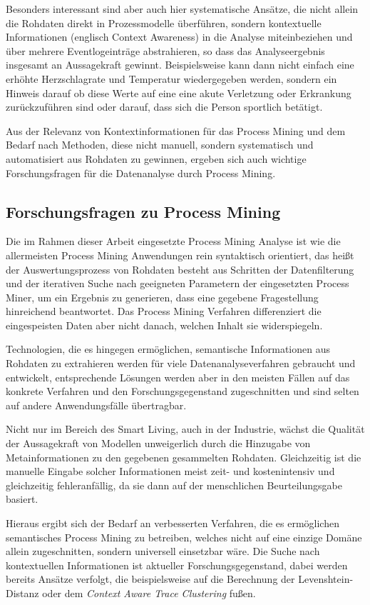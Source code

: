 Besonders interessant sind aber auch hier systematische Ansätze, die nicht allein die Rohdaten direkt in Prozessmodelle überführen, sondern kontextuelle Informationen (englisch Context Awareness) in die Analyse miteinbeziehen und über mehrere Eventlogeinträge abstrahieren, so dass das Analyseergebnis insgesamt an Aussagekraft gewinnt.
Beispielsweise kann dann nicht einfach eine erhöhte Herzschlagrate und Temperatur wiedergegeben werden, sondern ein Hinweis darauf ob diese Werte auf eine eine akute Verletzung oder Erkrankung zurückzuführen sind oder darauf, dass sich die Person sportlich betätigt. 

Aus der Relevanz von Kontextinformationen für das Process Mining und dem Bedarf nach Methoden, diese nicht manuell, sondern systematisch und automatisiert aus Rohdaten zu gewinnen, ergeben sich auch wichtige Forschungsfragen für die Datenanalyse durch Process Mining.

\subsection{Forschungsfragen zu Process Mining}
Die im Rahmen dieser Arbeit eingesetzte Process Mining Analyse ist wie die allermeisten Process Mining Anwendungen rein syntaktisch orientiert, das heißt der Auswertungsprozess von Rohdaten besteht aus Schritten der Datenfilterung und der iterativen Suche nach geeigneten Parametern der eingesetzten Process Miner, um ein Ergebnis zu generieren, dass eine gegebene Fragestellung hinreichend beantwortet. Das Process Mining Verfahren differenziert die eingespeisten Daten aber nicht danach, welchen Inhalt sie widerspiegeln. 

Technologien, die es hingegen ermöglichen, semantische Informationen aus Rohdaten zu extrahieren werden für viele Datenanalyseverfahren gebraucht und entwickelt, entsprechende Lösungen werden aber in den meisten Fällen auf das konkrete Verfahren und den Forschungsgegenstand zugeschnitten und sind selten auf andere Anwendungsfälle übertragbar. 

Nicht nur im Bereich des Smart Living, auch in der Industrie, wächst die Qualität der Aussagekraft von Modellen unweigerlich durch die Hinzugabe von Metainformationen zu den gegebenen gesammelten Rohdaten. Gleichzeitig ist die manuelle Eingabe solcher Informationen meist zeit- und kostenintensiv und gleichzeitig fehleranfällig, da sie dann auf der menschlichen Beurteilungsgabe basiert.

Hieraus ergibt sich der Bedarf an verbesserten Verfahren, die es ermöglichen semantisches Process Mining zu betreiben, welches nicht auf eine einzige Domäne allein zugeschnitten, sondern universell einsetzbar wäre. Die Suche nach kontextuellen Informationen ist aktueller Forschungsgegenstand, dabei werden bereits Ansätze verfolgt, die beispielsweise auf die Berechnung der Levenshtein-Distanz oder dem \textit{  Context Aware Trace Clustering} fußen.

